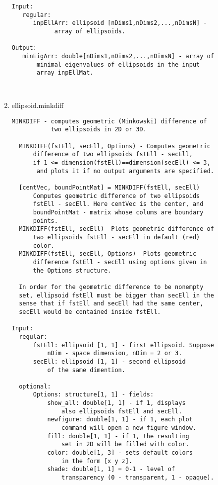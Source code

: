 \begin{enumerate}
\begin{lstlisting}
Input:
   regular:
      inpEllArr: ellipsoid [nDims1,nDims2,...,nDimsN] -
            array of ellipsoids.

Output:
   minEigArr: double[nDims1,nDims2,...,nDimsN] - array of
       minimal eigenvalues of ellipsoids in the input
       array inpEllMat.



\end{lstlisting}
\fontfamily{\familydefault}
\selectfont
\item {ellipsoid.minkdiff}
\selectfont
\begin{lstlisting}
MINKDIFF - computes geometric (Minkowski) difference of
           two ellipsoids in 2D or 3D.

  MINKDIFF(fstEll, secEll, Options) - Computes geometric
      difference of two ellipsoids fstEll - secEll,
      if 1 <= dimension(fstEll)==dimension(secEll) <= 3,
       and plots it if no output arguments are specified.

  [centVec, boundPointMat] = MINKDIFF(fstEll, secEll)
      Computes geometric difference of two ellipsoids
      fstEll - secEll. Here centVec is the center, and
      boundPointMat - matrix whose colums are boundary
      points.
  MINKDIFF(fstEll, secEll)  Plots geometric difference of
      two ellipsoids fstEll - secEll in default (red)
      color.
  MINKDIFF(fstEll, secEll, Options)  Plots geometric
      difference fstEll - secEll using options given in
      the Options structure.

  In order for the geometric difference to be nonempty
  set, ellipsoid fstEll must be bigger than secEll in the
  sense that if fstEll and secEll had the same center,
  secEll would be contained inside fstEll.

Input:
  regular:
      fstEll: ellipsoid [1, 1] - first ellipsoid. Suppose
          nDim - space dimension, nDim = 2 or 3.
      secEll: ellipsoid [1, 1] - second ellipsoid
          of the same dimention.

  optional:
      Options: structure[1, 1] - fields:
          show_all: double[1, 1] - if 1, displays
              also ellipsoids fstEll and secEll.
          newfigure: double[1, 1] - if 1, each plot
              command will open a new figure window.
          fill: double[1, 1] - if 1, the resulting
              set in 2D will be filled with color.
          color: double[1, 3] - sets default colors
              in the form [x y z].
          shade: double[1, 1] = 0-1 - level of
              transparency (0 - transparent, 1 - opaque).


\end{lstlisting}
\end{enumerate}
